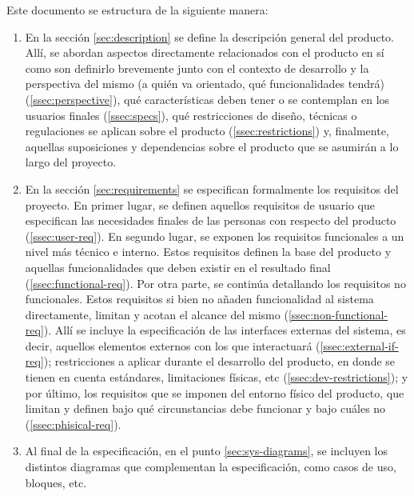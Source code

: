 Este documento se estructura de la siguiente manera:

\begin{enumerate}
  \item En la sección \ref{sec:description} se define la descripción general del
        producto. Allí, se abordan aspectos directamente relacionados con el producto en sí
        como son definirlo brevemente junto con el contexto de desarrollo y
        la perspectiva del mismo (a quién va orientado, qué funcionalidades tendrá)
        (\ref{ssec:perspective}), qué características deben tener o se contemplan en
        los usuarios finales (\ref{ssec:specs}), qué restricciones de diseño, técnicas
        o regulaciones se aplican sobre el producto (\ref{ssec:restrictions}) y,
        finalmente, aquellas suposiciones y dependencias sobre el producto que se
        asumirán a lo largo del proyecto.
  \item En la sección \ref{sec:requirements} se especifican formalmente los
        requisitos del proyecto. En primer lugar, se definen aquellos requisitos
        de usuario que especifican las necesidades finales de las personas con respecto
        del producto (\ref{ssec:user-req}). En segundo lugar, se exponen los requisitos
        funcionales a un nivel más técnico e interno. Estos requisitos definen la
        base del producto y aquellas funcionalidades que deben existir en el resultado
        final (\ref{ssec:functional-req}). Por otra parte, se continúa detallando
        los requisitos no funcionales. Estos requisitos si bien no añaden funcionalidad
        al sistema directamente, limitan y acotan el alcance del mismo (\ref{ssec:non-functional-req}).
        Allí se incluye la especificación de las interfaces externas
        del sistema, es decir, aquellos elementos externos con los que interactuará
        (\ref{ssec:external-if-req}); restricciones a aplicar durante el desarrollo del
        producto, en donde se tienen en cuenta estándares, limitaciones físicas, etc
        (\ref{ssec:dev-restrictions}); y por último, los requisitos que se imponen del
        entorno físico del producto, que limitan y definen bajo qué circunstancias
        debe funcionar y bajo cuáles no (\ref{ssec:phisical-req}).
  \item Al final de la especificación, en el punto \ref{sec:sys-diagrams}, se incluyen los distintos diagramas
        que complementan la especificación, como casos de uso, bloques, etc.
\end{enumerate}